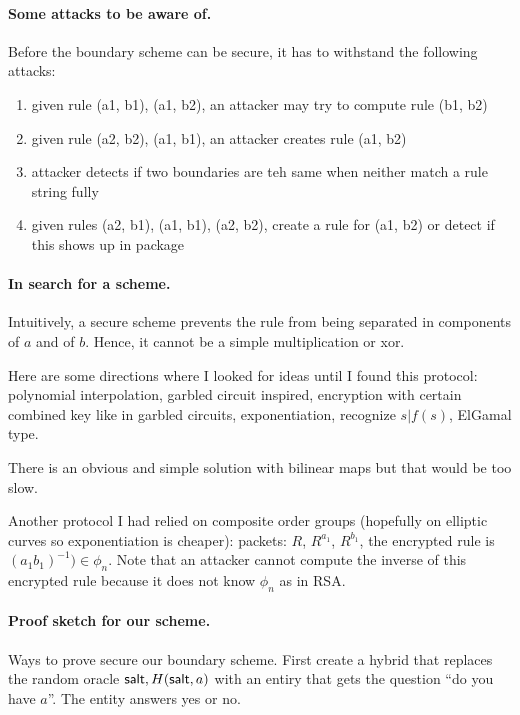 
\paragraph{Some attacks to be aware of.}
Before the boundary scheme can be secure, it has to withstand the following attacks:

\begin{enumerate}
\item given rule (a1, b1), (a1, b2), an attacker may try to compute rule (b1, b2)
\item given rule (a2, b2), (a1, b1), an attacker creates rule (a1, b2)
\item attacker detects if two boundaries are teh same when neither match a rule string fully
\item \label{step:rule} given rules (a2, b1), (a1, b1), (a2, b2), create a rule for (a1, b2) or detect if this shows up in package
\end{enumerate}

\paragraph{In search for a scheme.}
Intuitively, a secure scheme prevents the rule from being separated in components of $a$ and of $b$. Hence, it cannot be a simple multiplication or xor. 

Here are some directions where I looked for ideas until I found this protocol: polynomial interpolation, garbled circuit inspired, encryption with certain combined key like in garbled circuits, exponentiation, recognize $s | f(s)$, ElGamal type. 

There is an obvious and simple solution with bilinear maps but that would be too slow.  

Another protocol I had relied on composite order groups (hopefully on elliptic curves so exponentiation is cheaper): packets: $R$, $R^{a_1}$, $R^{b_1}$, the encrypted rule is $(a_1b_1)^{-1}) \in \phi_n$. Note that an attacker cannot compute the inverse of this encrypted rule because it does not know $\phi_n$ as in RSA. 


\paragraph{Proof sketch for our scheme.}
Ways to prove secure our boundary scheme. First create a hybrid that replaces the random oracle $\mathsf{salt}, H(\mathsf{salt}, a)$ with an entiry that gets the question ``do you have $a$''. The entity answers yes or no. 

